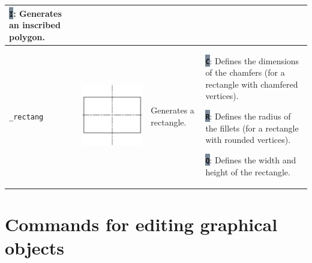 \documentclass[..]{../IEEEphot}
\newcommand{\param}[1]{\colorbox{LightSlateGray}{\color{Navy}\texttt{\textbf{#1}}}}
\begin{document}
\begin{center}
\begin{longtable}{m{.1\linewidth}m{.2\linewidth}m{.3\linewidth}m{.3\linewidth}}
\param{I}: Generates an inscribed polygon.  \\
\midrule
\texttt{\_rectang} & \includegraphics[width = 0.8\linewidth, keepaspectratio]{../images/jpg/_rectang.jpg} & Generates a rectangle. & 
\param{C}: Defines the dimensions of the chamfers (for a rectangle with chamfered vertices).

\param{R}: Defines the radius of the fillets (for a rectangle with rounded vertices).

\param{Q}: Defines the width and height of the rectangle.

\\
\bottomrule
\end{longtable}
\end{center}

\clearpage

\section{Commands for editing graphical objects}
\end{document}
